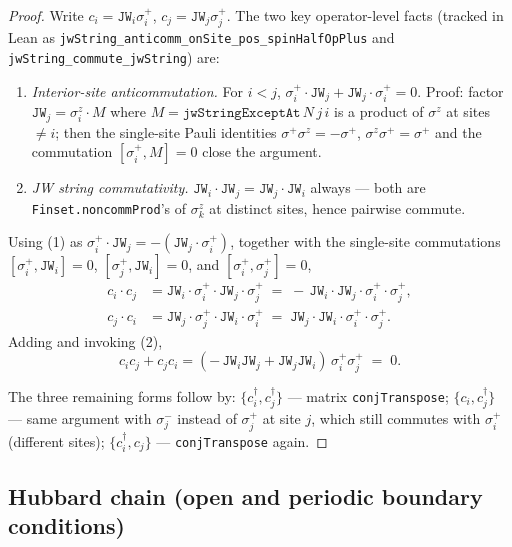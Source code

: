 \documentclass[a4paper,11pt]{article}
\begin{document}
\begin{proof}
Write \(c_i = \texttt{JW}_i \sigma^+_i\), \(c_j = \texttt{JW}_j \sigma^+_j\).
The two key operator-level facts (tracked in Lean as
\texttt{jwString\_anticomm\_onSite\_pos\_spinHalfOpPlus} and
\texttt{jwString\_commute\_jwString}) are:
\begin{enumerate}
\item \emph{Interior-site anticommutation.}
For \(i < j\), \(\sigma^+_i \cdot \texttt{JW}_j +
\texttt{JW}_j \cdot \sigma^+_i = 0\). Proof: factor
\(\texttt{JW}_j = \sigma^z_i \cdot M\) where \(M =
\texttt{jwStringExceptAt}\,N\,j\,i\) is a product of \(\sigma^z\)
at sites \(\neq i\); then the single-site Pauli identities
\(\sigma^+\sigma^z = -\sigma^+\), \(\sigma^z\sigma^+ = \sigma^+\)
and the commutation \([\sigma^+_i, M] = 0\) close the argument.
\item \emph{JW string commutativity.}
\(\texttt{JW}_i \cdot \texttt{JW}_j = \texttt{JW}_j \cdot \texttt{JW}_i\)
always — both are \texttt{Finset.noncommProd}'s of \(\sigma^z_k\) at
distinct sites, hence pairwise commute.
\end{enumerate}

Using (1) as \(\sigma^+_i \cdot \texttt{JW}_j =
-(\texttt{JW}_j \cdot \sigma^+_i)\), together with the
single-site commutations
\([\sigma^+_i, \texttt{JW}_i] = 0\),
\([\sigma^+_j, \texttt{JW}_i] = 0\), and \([\sigma^+_i, \sigma^+_j] = 0\),
\begin{align*}
  c_i \cdot c_j
  &= \texttt{JW}_i \cdot \sigma^+_i \cdot \texttt{JW}_j \cdot \sigma^+_j
  \;=\; -\,\texttt{JW}_i \cdot \texttt{JW}_j \cdot \sigma^+_i \cdot \sigma^+_j,\\
  c_j \cdot c_i
  &= \texttt{JW}_j \cdot \sigma^+_j \cdot \texttt{JW}_i \cdot \sigma^+_i
  \;=\; \texttt{JW}_j \cdot \texttt{JW}_i \cdot \sigma^+_i \cdot \sigma^+_j.
\end{align*}
Adding and invoking (2),
\[
  c_i c_j + c_j c_i =
    (-\,\texttt{JW}_i \texttt{JW}_j + \texttt{JW}_j \texttt{JW}_i)
      \,\sigma^+_i \sigma^+_j \;=\; 0.
\]

The three remaining forms follow by:
\(\{c_i^\dagger, c_j^\dagger\}\) --- matrix
\texttt{conjTranspose};
\(\{c_i, c_j^\dagger\}\) --- same argument with \(\sigma^-_j\)
instead of \(\sigma^+_j\) at site \(j\), which still commutes with
\(\sigma^+_i\) (different sites);
\(\{c_i^\dagger, c_j\}\) --- \texttt{conjTranspose} again.
\end{proof}

\subsection{Hubbard chain (open and periodic boundary conditions)}
\label{subsec:hubbard-chain}
\end{document}
